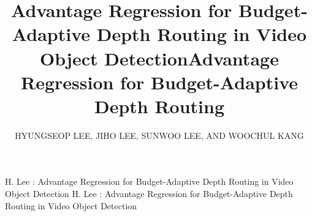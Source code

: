 \documentclass{ieeeaccess}
\begin{document}

\title{Advantage Regression for Budget-Adaptive Depth Routing in Video Object Detection}
\title{Advantage Regression for Budget-Adaptive Depth Routing}
\author{
    \uppercase{Hyungseop Lee}, 
    \uppercase{Jiho Lee}, 
    \uppercase{Sunwoo Lee}, %
    AND \uppercase{Woochul Kang} 
}
\address[1]{Department of Embedded Systems Engineering, Incheon National University, Incheon, Republic of Korea}

\markboth
{H. Lee \headeretal: Advantage Regression for Budget-Adaptive Depth Routing in Video Object Detection}
{H. Lee \headeretal: Advantage Regression for Budget-Adaptive Depth Routing in Video Object Detection}




\titlepgskip=-21pt

\maketitle








\clearpage




\end{document}

